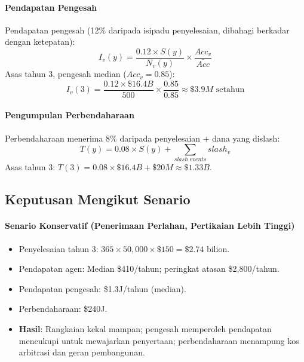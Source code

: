 \documentclass[11pt]{article}
\begin{document}
\paragraph{Pendapatan Pengesah} Pendapatan pengesah (12\% daripada isipadu penyelesaian, dibahagi berkadar dengan ketepatan):
\begin{equation}
I_v(y) = \frac{0.12 \times S(y)}{N_v(y)} \times \frac{Acc_v}{\bar{Acc}}
\end{equation}
Asas tahun 3, pengesah median ($Acc_v = 0.85$):
\begin{equation}
I_v(3) = \frac{0.12 \times \$16.4B}{500} \times \frac{0.85}{0.85} \approx \$3.9M \text{ setahun}
\end{equation}

\paragraph{Pengumpulan Perbendaharaan} Perbendaharaan menerima 8\% daripada penyelesaian + dana yang dislash:
\begin{equation}
T(y) = 0.08 \times S(y) + \sum_{slash \; events} slash_v
\end{equation}
Asas tahun 3: $T(3) = 0.08 \times \$16.4B + \$20M \approx \$1.33B$.

\subsection{Keputusan Mengikut Senario}
\paragraph{Senario Konservatif (Penerimaan Perlahan, Pertikaian Lebih Tinggi)}
\begin{itemize}[noitemsep]
  \item Penyelesaian tahun 3: $365 \times 50{,}000 \times \$150 = \$2.74$ bilion.
  \item Pendapatan agen: Median \$410/tahun; peringkat atasan \$2{,}800/tahun.
  \item Pendapatan pengesah: \$1.3J/tahun (median).
  \item Perbendaharaan: \$240J.
  \item \textbf{Hasil}: Rangkaian kekal mampan; pengesah memperoleh pendapatan mencukupi untuk mewajarkan penyertaan; perbendaharaan menampung kos arbitrasi dan geran pembangunan.
\end{itemize}
\end{document}
